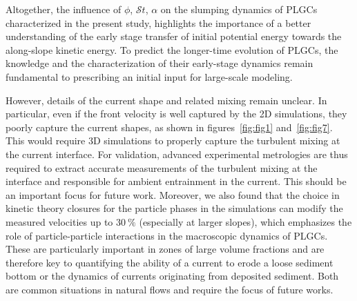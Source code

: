 \documentclass[12pt]{article}
\begin{document}
Altogether, the influence of $\phi$, $\mathcal{S}t$, $\alpha$ on the slumping dynamics of PLGCs characterized in the present study, highlights the importance of a better understanding of the early stage transfer of initial potential energy towards the along-slope kinetic energy. To predict the longer-time evolution of PLGCs, the knowledge and the characterization of their early-stage dynamics remain fundamental to prescribing an initial input for large-scale modeling.

However, details of the current shape and related mixing remain unclear. In particular, even if the front velocity is well captured by the 2D simulations, they poorly capture the current shapes, as shown in figures~\ref{fig:fig1} and~\ref{fig:fig7}. This would require 3D simulations to properly capture the turbulent mixing at the current interface. For validation, advanced experimental metrologies are thus required to extract accurate measurements of the turbulent mixing at the interface and responsible for ambient entrainment in the current. This should be an important focus for future work.
%
Moreover, we also found that the choice in kinetic theory closures for the particle phases in the simulations can modify the measured velocities up to $30~\%$ (especially at larger slopes), which emphasizes the role of particle-particle interactions in the macroscopic dynamics of PLGCs. These are particularly important in zones of large volume fractions and are therefore key to quantifying the ability of a current to erode a loose sediment bottom or the dynamics of currents originating from deposited sediment. Both are common situations in natural flows and require the focus of future works.


\end{document}
